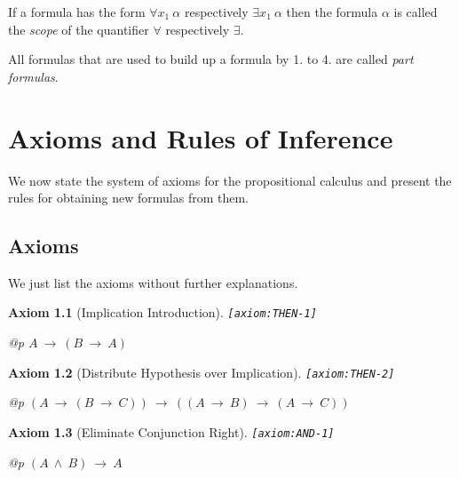 \documentclass[a4paper,german,10pt,twoside]{book}
\newtheorem{ax}{Axiom}
\theoremstyle{definition}
\theoremstyle{remark}
\begin{document}
\par
If a formula has the form $\forall x_1 ~ \alpha$ respectively $\exists x_1 ~ \alpha$ then the formula $\alpha$ is called the
\emph{scope} of the quantifier $\forall$ respectively $\exists$.

\par
All formulas that are used to build up a formula by 1. to 4. are called \emph{part formulas}.



\chapter{Axioms and Rules of Inference} \label{chapter3} \hypertarget{chapter3}{}

We now state the system of axioms for the propositional calculus and present the rules for obtaining new formulas from them.

\section{Axioms} \label{chapter3_section1} \hypertarget{chapter3_section1}{}
We just list the axioms without further explanations.

\begin{ax}[Implication Introduction]
\label{axiom:THEN-1} \hypertarget{axiom:THEN-1}{}
{\tt \tiny [\verb]axiom:THEN-1]]}
\mbox{}
\begin{longtable}{{@{\extracolsep{\fill}}p{\linewidth}}}
\centering $A\ \rightarrow\ (B\ \rightarrow\ A)$
\end{longtable}

\end{ax}


\begin{ax}[Distribute Hypothesis over Implication]
\label{axiom:THEN-2} \hypertarget{axiom:THEN-2}{}
{\tt \tiny [\verb]axiom:THEN-2]]}
\mbox{}
\begin{longtable}{{@{\extracolsep{\fill}}p{\linewidth}}}
\centering $(A\ \rightarrow\ (B\ \rightarrow\ C))\ \rightarrow\ ((A\ \rightarrow\ B)\ \rightarrow\ (A\ \rightarrow\ C))$
\end{longtable}

\end{ax}


\begin{ax}[Eliminate Conjunction Right]
\label{axiom:AND-1} \hypertarget{axiom:AND-1}{}
{\tt \tiny [\verb]axiom:AND-1]]}
\mbox{}
\begin{longtable}{{@{\extracolsep{\fill}}p{\linewidth}}}
\centering $(A\ \land\ B)\ \rightarrow\ A$
\end{longtable}

\end{ax}
\end{document}
